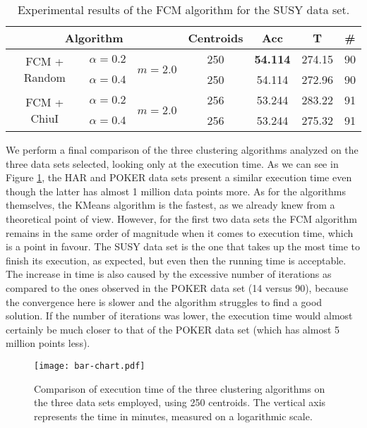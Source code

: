 \begin{table}[h!]
\centering
\caption{Experimental results of the FCM algorithm for the SUSY data set.}
\label{tab:susy2}
\begin{tabular}{ccccccc}
\toprule
\multicolumn{3}{c}{Algorithm} & Centroids & Acc & T & \#\\ \midrule
 \multirow{2}{*}{FCM + Random} & $\alpha = 0.2$ & \multirow{2}{*}{$m=2.0$} & 250 & \textbf{54.114} & 274.15 & 90\\
& $\alpha=0.4$ &  & 250 & 54.114 & 272.96 & 90\\
\multirow{2}{*}{FCM + ChiuI} & $\alpha = 0.2$ & \multirow{2}{*}{$m=2.0$} & 256 & 53.244 & 283.22 & 91\\
& $\alpha=0.4$ &  & 256 & 53.244 & 275.32 & 91\\ \bottomrule
\end{tabular}
\end{table}

We perform a final comparison of the three clustering algorithms analyzed on the three data sets selected, looking only at the execution time. As we can see in Figure \ref{fig:bar-chart}, the HAR and POKER data sets present a similar execution time even though the latter has almost 1 million data points more. As for the algorithms themselves, the KMeans algorithm is the fastest, as we already knew from a theoretical point of view. However, for the first two data sets the FCM algorithm remains in the same order of magnitude when it comes to execution time, which is a point in favour. The SUSY data set is the one that takes up the most time to finish its execution, as expected, but even then the running time is acceptable. The increase in time is also caused by the excessive number of iterations as compared to the ones observed in the POKER data set (14 versus 90), because the convergence here is slower and the algorithm struggles to find a good solution. If the number of iterations was lower, the execution time would almost certainly be much closer to that of the POKER data set (which has almost 5 million points less).

\begin{figure}[h!]
\centering
\texttt{[image: bar-chart.pdf]}
\caption{Comparison of execution time of the three clustering algorithms on the three data sets employed, using 250 centroids. The vertical axis represents the time in minutes, measured on a logarithmic scale.}
\label{fig:bar-chart}
\end{figure}

